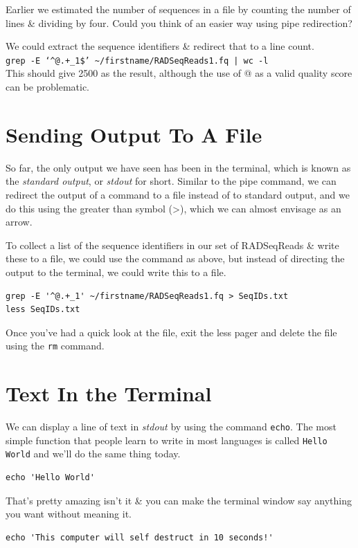 \documentclass[a4paper,12pt,twoside]{memoir}
\begin{document}
\begin{questions}
Earlier we estimated the number of sequences in a file by counting the number of lines \& dividing by four.
Could you think of an easier way using pipe redirection? \\
\begin{answer}
We could extract the sequence identifiers \& redirect that to a line count.\\
\texttt{grep -E `\^{}@.+_1\$' \~{}/firstname/RADSeqReads1.fq | wc -l} \\
This should give 2500 as the result, although the use of @ as a valid
quality score can be problematic.
\end{answer}
\end{questions}

\section{Sending Output To A File}
\begin{information}
So far, the only output we have seen has been in the terminal, which is known as the \textit{standard output}, or \textit{stdout} for short.
Similar to the pipe command, we can redirect the output of a command to a file instead of to standard output, and we do this using the greater than symbol (\textgreater), which we can almost envisage as an arrow.
\end{information}

\begin{steps}
To collect a list of the sequence identifiers in our set of RADSeqReads \& write these to a file, we could use the command as above, but instead of directing the output to the terminal, we could write this to a file.
\end{steps}
\begin{lstlisting}
grep -E '^@.+_1' ~/firstname/RADSeqReads1.fq > SeqIDs.txt
less SeqIDs.txt
\end{lstlisting}

Once you've had a quick look at the file, exit the less pager and delete the file using the \texttt{rm} command.

\section{Text In the Terminal}
We can display a line of text in \textit{stdout} by using the command \texttt{echo}.
The most simple function that people learn to write in most languages is called \texttt{Hello World} and we'll do the same thing today.
\begin{steps}
\begin{lstlisting}
echo 'Hello World'
\end{lstlisting}
\end{steps}
That's pretty amazing isn't it \& you can make the terminal window say anything you want without meaning it.\\
\begin{lstlisting}
echo 'This computer will self destruct in 10 seconds!'
\end{lstlisting}
\end{document}
